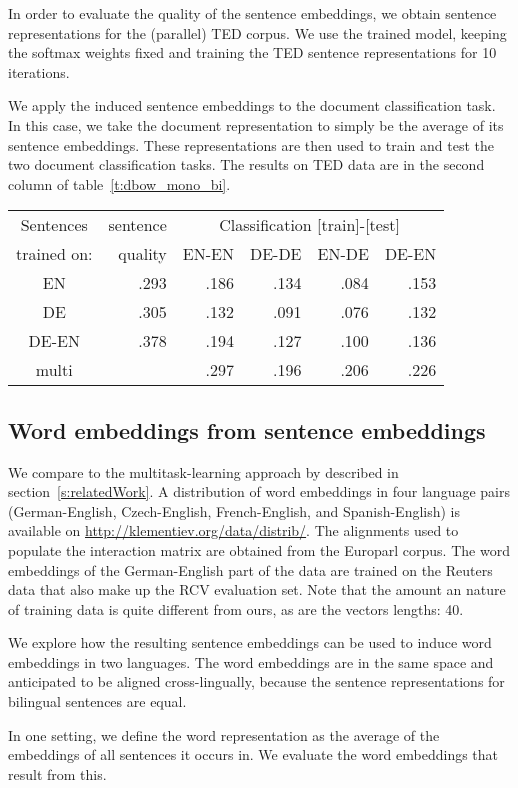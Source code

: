  In order to evaluate the quality of the sentence embeddings, we obtain sentence representations for the (parallel) TED corpus. We use the trained model, keeping the softmax weights fixed and training the TED sentence representations for 10 iterations.

We apply the induced sentence embeddings to the document classification task. In this case, we take the document representation to simply be the average of its sentence embeddings. These representations are then used to train and test the two document classification tasks. The results on TED data are in the second column of table~\ref{t:dbow_mono_bi}.

\begin{table*}[t]
\center
\begin{tabular}{c | r|r r r r }
Sentences 		&sentence	&	\multicolumn{4}{c}{Classification [train]-[test]}	\\
trained on: 		&quality	&EN-EN	&DE-DE	&EN-DE	&DE-EN	\\\hline
EN			&.293		&.186		&.134		&.084		&.153		\\
DE			&.305		&.132		&.091		&.076		&.132		\\
DE-EN			&.378		&.194		&.127		&.100		&.136		\\
multi 			&		&.297		&.196		&.206		&.226		\\
\end{tabular}
\caption{F1 scores on TED classification task for sentence representations and word representations.}
\label{t:dbow_mono_bi}
\end{table*}



\subsection{Word embeddings from sentence embeddings}

We compare to the multitask-learning approach by \cite{klementiev2012inducing} described in section~\ref{s:relatedWork}. A distribution of word embeddings in four language pairs (German-English, Czech-English, French-English, and Spanish-English) is available on \url{http://klementiev.org/data/distrib/}. The alignments used to populate the interaction matrix are obtained from the Europarl corpus. The word embeddings of the German-English part of the data are trained on the Reuters data that also make up the RCV evaluation set. Note that the amount an nature of training data is quite different from ours, as are the vectors lengths: 40.



We explore how the resulting sentence embeddings can be used to induce word embeddings in two languages. The word embeddings are in the same space and anticipated to be aligned cross-lingually, because the sentence representations for bilingual sentences are equal.

In one setting, we define the word representation as the average of the embeddings of all sentences it occurs in. We evaluate the word embeddings that result from this.



